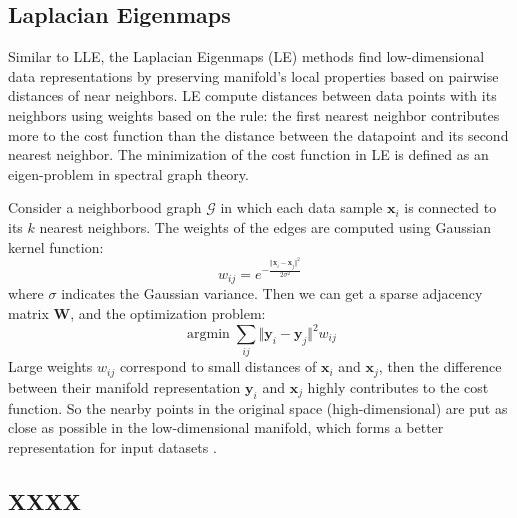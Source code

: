 \documentclass[journal]{IEEEtran}
\DeclareMathOperator*{\argmin}{argmin}
\begin{document}
%
%
\subsection{Laplacian Eigenmaps}
Similar to LLE, the Laplacian Eigenmaps (LE) methods find low-dimensional data representations by preserving manifold's local properties based on pairwise distances of near neighbors.
LE compute distances between data points with its neighbors using weights based on the rule: the first nearest neighbor contributes more to the cost function than the distance between the datapoint and its second nearest neighbor.
The minimization of the cost function in LE is defined as an eigen-problem in spectral graph theory.
 
Consider a neighborbood graph $\mathcal{G}$ in which each data sample $\bm{x}_i$ is connected to its $k$ nearest neighbors.
The weights of the edges are computed using Gaussian kernel function:
\begin{equation}
w_{ij} = e^{-\frac{\Vert \bm{x}_i - \bm{x}_j \Vert^2}{2\sigma^2}}
\end{equation}
where $\sigma$ indicates the Gaussian variance.
Then we can get a sparse adjacency matrix $\bm{W}$, and the optimization problem:
\begin{equation}
\argmin \sum_{ij} \Vert\bm{y}_i - \bm{y}_j \Vert^2 w_{ij}
\end{equation}
Large weights $w_{ij}$ correspond to small distances of $\bm{x}_i$ and $\bm{x}_j$, then the difference between their manifold representation $\bm{y}_i$ and $\bm{x}_j$ highly contributes to the cost function.
So the nearby points in the original space (high-dimensional) are put as close as possible in the low-dimensional manifold, which forms a better representation for input datasets \cite{belkin2003laplacian}.




%
%
\subsection{XXXX}


%
%


%
%
\end{document}
